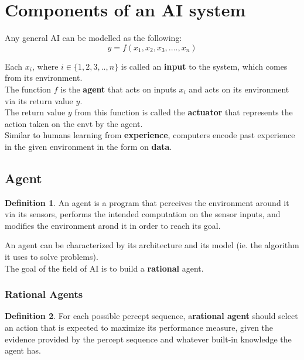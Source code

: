 \documentclass{article}
\theoremstyle{plain}
\theoremstyle{definition}
\newtheorem{defn}{Definition} %
\begin{document}
\section{Components of an AI system}
    Any general AI can be modelled as the following: 
    \begin{equation}
        y = f(x_1, x_2, x_3, ...., x_n)
    \end{equation}
    
    Each $x_i$, where $i \in \{ 1, 2, 3, .., n\}$ is called an \textbf{input} to the system, which comes from its environment.\\
    The function $f$ is the \textbf{agent} that acts on inputs $x_i$ and acts on its environment via its return value $y$.\\
    The return value $y$ from this function is called the \textbf{actuator} that represents the action taken on the envt by the agent. \\
    Similar to humans learning from \textbf{experience}, computers encode past experience in the given environment in the form on \textbf{data}.
    
    \subsection{Agent}
    
    \begin{defn}
    An agent is a program that perceives the environment around it via its sensors, performs the intended computation on the sensor inputs, and modifies the environment arond it in order to reach its goal.
    \end{defn}
    An agent can be characterized by its architecture and its model (ie. the algorithm it uses to solve problems).\\
    The goal of the field of AI is to build a \textbf{rational} agent.
    
    \subsubsection{Rational Agents}
    
    \begin{defn}
    For each possible percept sequence, a\textbf{rational agent} should select an action that is expected to maximize its performance measure, given the evidence provided by the percept sequence and whatever built-in knowledge the agent has.
    \end{defn}
    
\end{document}
